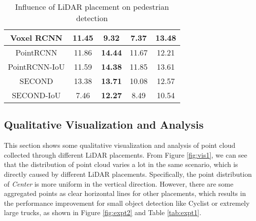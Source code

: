 \documentclass[10pt,twocolumn,letterpaper]{article}
\newcommand{\todo}[1]{\hl{[#1]}}
\begin{document}
\begin{table}[H]
{\begin{tabular}{|c||c|c|c|c|}
Voxel RCNN   \cite{deng2020voxel}
&    11.45  & 	9.32 & 	 7.37  & 	 \textbf{13.48}
                                                 \\ \hline
PointRCNN       \cite{Shi_2019_CVPR}
&    11.86  & 	\textbf{14.44} & 	 11.67  & 	 12.21
                 \\ \hline
PointRCNN-IoU    \cite{Shi_2019_CVPR}
&    11.59  & 	\textbf{14.38}	 &  11.85  & 	 13.61
                         \\ \hline
SECOND         \cite{yan2018second}
&    13.38  & 	\textbf{13.71}	 &  10.08  & 	 12.57
                                \\ \hline
SECOND-IoU    \cite{yan2018second}
&   7.46  & 	\textbf{12.27} & 	 8.49  & 	 10.54
                                 \\ \hline
\end{tabular}}
\caption{Influence of LiDAR placement on pedestrian detection}
\vspace*{-3mm}
\end{table}


\subsection{Qualitative Visualization and Analysis}
This section shows some qualitative visualization and analysis of point cloud collected through different LiDAR placements. From Figure \ref{fig:vis1}, we can see that the distribution of point cloud varies a lot in the same scenario, which is directly caused by different LiDAR placements. Specifically, the point distribution of \textit{Center} is more uniform in the vertical direction. However, there are some aggregated points as clear horizontal lines for other placements, which results in the performance improvement for small object detection like Cyclist or extremely large trucks, as shown in Figure \ref{fig:expt2} and Table \ref{tab:expt1}.
\end{document}
